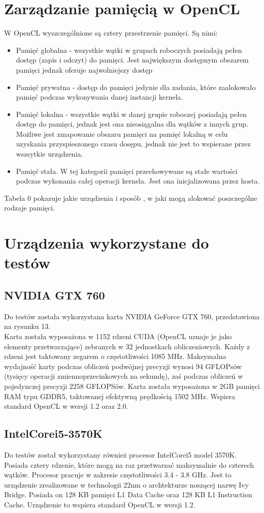 \section{Zarządzanie pamięcią w OpenCL}
W OpenCL wyszczególnione są cztery przestrzenie pamięci. Są nimi:
\begin{itemize}
  \item Pamięć globalna - wszystkie wątki w grupach roboczych posiadają pełen dostęp (zapis i odczyt) do pamięci. Jest największym dostępnym obszarem pamięci jednak oferuje najwolniejszy dostęp
  \item Pamięć prywatna - dostęp do pamięci jedynie dla zadania, które zaalokowało pamięć podczas wykonywania danej instancji kernela.
  \item Pamięć lokalna - wszystkie wątki w danej grupie roboczej posiadają pełen dostęp do pamięci, jednak jest ona nieosiągalna dla wątków z innych grup. Możliwe jest zmapowanie obszaru pamięci na pamięć lokalną w celu uzyskania przyspieszonego czasu dosępu, jednak nie jest to wspierane przez wszsytkie urządzenia.
  \item Pamięć stała. W tej kategorii pamięci przechowywane są stałe wartości podczas wykonania całej operacji kernela. Jest ona inicjalizowana przez hosta.
\end{itemize}

Tabela 0 pokazuje jakie urządzenia i sposób , w jaki mogą alokować poszczególne rodzaje pamięci.



\section{Urządzenia wykorzystane do testów}
\subsection{NVIDIA GTX 760}
Do testów została wykorzystana karta NVIDIA GeForce GTX 760, przedstawiona na rysunku 13. \\
Karta została wyposażona w 1152 rdzeni CUDA (OpenCL uznaje je jako elementy przetwarzające) zebranych w 32 jednostkach obliczeniowych. Każdy z rdzeni jest taktowany zegarem o częstotliwości 1085 MHz. Maksymalna wydajność karty podczas obliczeń podwójnej precyzji wynosi 94 GFLOPsów (tysięcy operacji zmiennoprzecinkowych na sekundę), zaś podczas obliczeń w pojedynczej precyzji 2258 GFLOPSów. Karta została wyposażona w 2GB pamięci RAM typu GDDR5, taktowanej efektywną prędkością 1502 MHz. Wspiera standard OpenCL w wersji 1.2 oraz 2.0.
\subsection{Intel\textregistered Core\texttrademark i5-3570K}
Do testów został wykorzystany również procesor Intel\textregistered Core\texttrademark i5 model 3570K. Posiada cztery rdzenie, które mogą na raz przetwarzać maksymalnie do czterech wątków. Procesor pracuje w zakresie częstotliwości 3.4 - 3.8 GHz. Jest to urządzenie zrealizowane w technologii 22nm o archtekturze noszącej nazwę Ivy Bridge. Posiada on 128 KB pamięci L1 Data Cache oraz 128 KB L1 Instruction Cache. Urządzenie to wspiera standard OpenCL w wersji 1.2.

